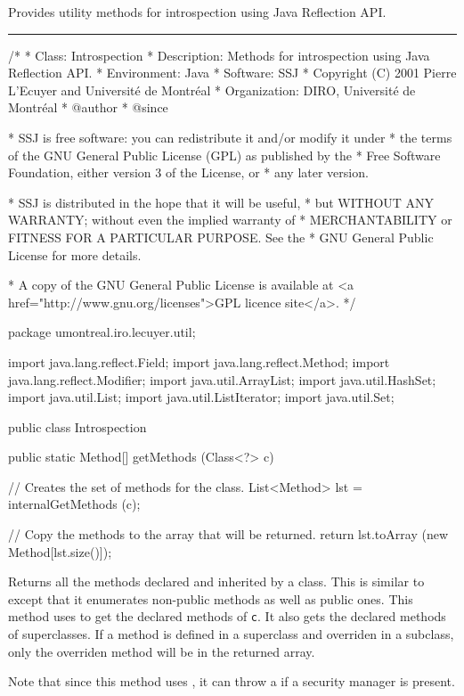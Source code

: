 
Provides utility methods for introspection using
Java Reflection API.

\bigskip\hrule

\begin{code}\begin{hide}
/*
 * Class:        Introspection
 * Description:  Methods for introspection using Java Reflection API.
 * Environment:  Java
 * Software:     SSJ 
 * Copyright (C) 2001  Pierre L'Ecuyer and Université de Montréal
 * Organization: DIRO, Université de Montréal
 * @author       
 * @since

 * SSJ is free software: you can redistribute it and/or modify it under
 * the terms of the GNU General Public License (GPL) as published by the
 * Free Software Foundation, either version 3 of the License, or
 * any later version.

 * SSJ is distributed in the hope that it will be useful,
 * but WITHOUT ANY WARRANTY; without even the implied warranty of
 * MERCHANTABILITY or FITNESS FOR A PARTICULAR PURPOSE.  See the
 * GNU General Public License for more details.

 * A copy of the GNU General Public License is available at
   <a href="http://www.gnu.org/licenses">GPL licence site</a>.
 */
\end{hide}
package umontreal.iro.lecuyer.util;\begin{hide}

import java.lang.reflect.Field;
import java.lang.reflect.Method;
import java.lang.reflect.Modifier;
import java.util.ArrayList;
import java.util.HashSet;
import java.util.List;
import java.util.ListIterator;
import java.util.Set;
\end{hide}


public class Introspection\begin{hide} {
   private Introspection() {}\end{hide}

   public static Method[] getMethods (Class<?> c)\begin{hide} {
      // Creates the set of methods for the class.
      List<Method> lst = internalGetMethods (c);

      // Copy the methods to the array that will be returned.
      return lst.toArray (new Method[lst.size()]);
   }\end{hide}
\end{code}
\begin{tabb}   Returns all the methods declared and inherited
 by a class. This is similar to 
 except that it enumerates non-public methods as well as public ones.
 This method uses 
 to get the declared methods of \texttt{c}.
 It also gets the declared methods of superclasses.
 If a method is defined in a superclass and overriden
 in a subclass, only the overriden method will be
 in the returned array.

 Note that since this method uses
 ,
 it can throw a  if
 a security manager is present.
\end{tabb}
